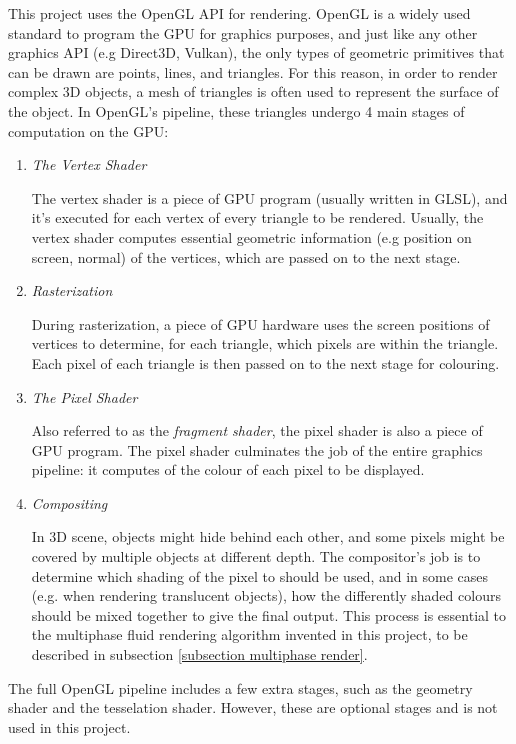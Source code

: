 This project uses the OpenGL API for rendering. OpenGL is a widely used standard to program the GPU for graphics purposes, and just like any other graphics API (e.g Direct3D, Vulkan), the only types of geometric primitives that can be drawn are points, lines, and triangles. For this reason, in order to render complex 3D objects, a mesh of triangles is often used to represent the surface of the object. In OpenGL's pipeline, these triangles undergo 4 main stages of computation on the GPU:
\begin{enumerate}
    \item 
    \textit{The Vertex Shader}

    The vertex shader is a piece of GPU program (usually written in GLSL), and it's executed for each vertex of every triangle to be rendered. Usually, the vertex shader computes essential geometric information (e.g position on screen, normal) of the vertices, which are passed on to the next stage.
    
    \item 
    \textit{Rasterization}

    During rasterization, a piece of GPU hardware uses the screen positions of vertices to determine, for each triangle, which pixels are within the triangle. Each pixel of each triangle is then passed on to the next stage for colouring.
    
    \item
    \textit{The Pixel Shader}

    Also referred to as the \textit{fragment shader}, the pixel shader is also a piece of GPU program. The pixel shader culminates the job of the entire graphics pipeline: it computes of the colour of each pixel to be displayed.

    \item 
    \textit{Compositing}

    In 3D scene, objects might hide behind each other, and some pixels might be covered by multiple objects at different depth. The compositor's job is to determine which shading of the pixel to should be used, and in some cases (e.g. when rendering translucent objects), how the differently shaded colours should be mixed together to give the final output. This process is essential to the multiphase fluid rendering algorithm invented in this project, to be described in subsection \ref{subsection multiphase render}.
    
\end{enumerate}

The full OpenGL pipeline includes a few extra stages, such as the geometry shader and the tesselation shader. However, these are optional stages and is not used in this project. 


